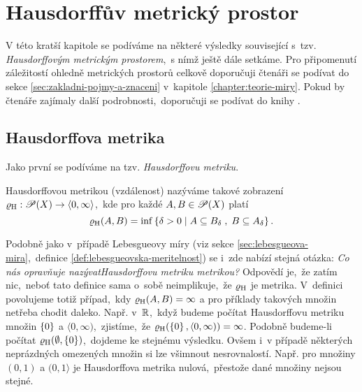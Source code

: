 \chapter{Hausdorffův metrický prostor}\label{chapter:hausdorffuv-mp}

V této kratší kapitole se podíváme na některé výsledky související s~tzv. \emph{Hausdorffovým metrickým prostorem},~s nímž ještě dále setkáme. Pro připomenutí záležitostí ohledně metrických prostorů celkově doporučuji čtenáři se podívat do sekce \ref{sec:zakladni-pojmy-a-znaceni} v~kapitole \ref{chapter:teorie-miry}. Pokud by čtenáře zajímaly další podrobnosti,~doporučuji se podívat do knihy \citep[str. 71]{Edgar2008}.

\section{Hausdorffova metrika}\label{sec:hausdorffova-metrika}

Jako první se podíváme na tzv. \emph{Hausdorffovu metriku}.
\begin{definition}\label{def:hausdorffova-metrika}
    Hausdorffovou metrikou (vzdálenost) nazýváme takové zobrazení $\varrho_\textup{H}:\mathscr{P}(X) \rightarrow \langle0,\infty\rangle$,~kde pro každé $A,B\in\mathscr{P}(X)$ platí
    \[\varrho_\textup{H}(A,B)=\inf\left\{\delta>0\;\middle|\;A\subseteq B_\delta\;,\;B\subseteq A_\delta\right\}.\]
\end{definition}
Podobně jako v~případě Lebesgueovy míry (viz sekce \ref{sec:lebesgueova-mira},~definice \ref{def:lebesgueovska-meritelnost}) se i~zde nabízí stejná otázka: \emph{Co nás opravňuje nazývat\linebreak{}Hausdorffovu metriku metrikou?} Odpovědí je,~že zatím nic,~neboť tato definice sama o~sobě neimplikuje,~že $\varrho_\textup{H}$ je metrika. V~definici povolujeme totiž případ,~kdy $\varrho_\textup{H}(A,B)=\infty$ a pro příklady takových množin netřeba chodit daleko. Např. v~$\mathbb{R}$,~když budeme počítat Hausdorffovu metriku množin $\left\{0\right\}$ a $\langle 0,\infty)$,~zjistíme,~že $\varrho_\textup{H}(\left\{0\right\},\langle 0,\infty))=\infty$. Podobně budeme-li počítat $\varrho_\textup{H}(\emptyset,\left\{0\right\})$,~dojdeme ke stejnému výsledku. Ovšem i~v případě některých neprázdných omezených množin si lze všimnout nesrovnalostí. Např. pro množiny $(0,1)$ a $(0,1\rangle$ je Hausdorffova metrika nulová,~přestože dané množiny nejsou stejné.

